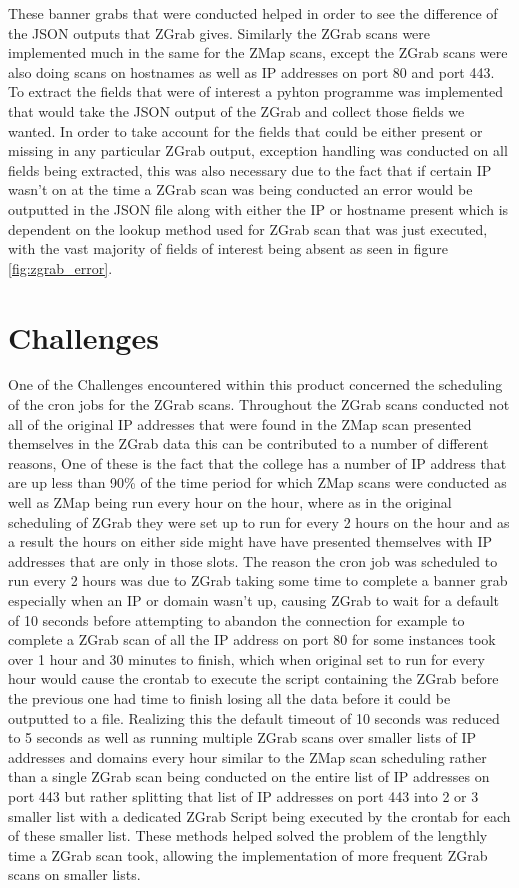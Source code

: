 \documentclass[a4wide,leqno,12pt]{report}
\begin{document}
These banner grabs that were conducted helped in order to see the difference of the JSON outputs that ZGrab gives. Similarly the ZGrab scans were implemented much in the same for the ZMap scans, except the ZGrab scans were also doing scans on hostnames as well as IP addresses on port 80 and port 443. To extract the fields that were of interest a pyhton programme was implemented that would take the JSON output of the ZGrab and collect those fields we wanted. In order to take account for the fields that could be either present or missing in any particular ZGrab output, exception handling was conducted on all fields being extracted, this was also necessary due to the fact that if certain IP wasn't on at the time a ZGrab scan was being conducted an error would be outputted in the JSON file along with either the IP or hostname present which is dependent on the lookup method used for ZGrab scan that was just executed, with the vast majority of fields of interest being absent as seen in figure \ref{fig:zgrab_error}.
\section{Challenges}

One of the Challenges encountered within this product concerned the scheduling of the cron jobs for the ZGrab scans. Throughout the ZGrab scans conducted not all of the original IP addresses that were found in the ZMap scan presented themselves in the ZGrab data this can be contributed to a number of different reasons, One of these is the fact that the college has a number of IP address that are up less than 90\% of the time period for which ZMap scans were conducted as well as ZMap being run every hour on the hour, where as in the original scheduling of ZGrab they were set up to run for every 2 hours on the hour and as a result the hours on either side might have have presented themselves with IP addresses that are only in those slots. The reason the cron job was scheduled to run every 2 hours was due to ZGrab taking some time to complete a banner grab especially when an IP or domain wasn't up, causing ZGrab to wait for a default of 10 seconds before attempting to abandon the connection for example to complete a ZGrab scan of all the IP address on port 80 for some instances took over 1 hour and 30 minutes to finish, which when original set to run for every hour would cause the crontab to execute the script containing the ZGrab before the previous one had time to finish losing all the data before it could be outputted to a file. Realizing this the default timeout of 10 seconds was reduced to 5 seconds as  well as running multiple ZGrab scans over smaller lists of IP addresses and domains every hour similar to the ZMap scan scheduling rather than a single ZGrab scan being conducted on the entire list of IP addresses on port 443 but rather splitting that list of IP addresses on port 443 into 2 or 3 smaller list with a dedicated ZGrab Script being executed by the crontab for each of these smaller list. These methods helped solved the problem of the lengthly time a ZGrab scan took, allowing the implementation of more frequent ZGrab scans on smaller lists.
\end{document}
